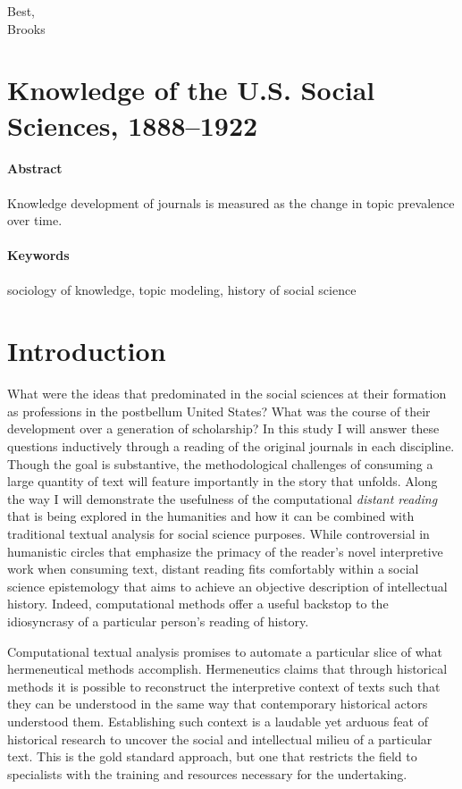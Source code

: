 \documentclass[]{book}
\begin{document}
Best,\\
Brooks




\chapter*{Knowledge of the U.S. Social Sciences, 1888--1922}\label{kd}

\subsubsection*{Abstract}\label{abstract}


Knowledge development of journals is measured as the change
in topic prevalence over time.

\subsubsection*{Keywords}\label{keywords}


sociology of knowledge, topic modeling, history of social science

\chapter{Introduction}\label{kd-intro}

What were the ideas that predominated in the social sciences at their
formation as professions in the postbellum United States? What was the
course of their development over a generation of scholarship? In this
study I will answer these questions inductively through a reading of the
original journals in each discipline. Though the goal is substantive,
the methodological challenges of consuming a large quantity of text will
feature importantly in the story that unfolds. Along the way I will
demonstrate the usefulness of the computational \emph{distant reading}
that is being explored in the humanities and how it can be combined with
traditional textual analysis for social science purposes. While
controversial in humanistic circles that emphasize the primacy of the
reader's novel interpretive work when consuming text, distant reading
fits comfortably within a social science epistemology that aims to
achieve an objective description of intellectual history. Indeed,
computational methods offer a useful backstop to the idiosyncrasy of a
particular person's reading of history.

Computational textual analysis promises to automate a particular slice
of what hermeneutical methods accomplish. Hermeneutics claims that
through historical methods it is possible to reconstruct the
interpretive context of texts such that they can be understood in the
same way that contemporary historical actors understood them.
Establishing such context is a laudable yet arduous feat of historical
research to uncover the social and intellectual milieu of a particular
text. This is the gold standard approach, but one that restricts the
field to specialists with the training and resources necessary for the
undertaking.
\end{document}
